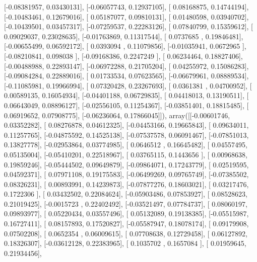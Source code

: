 \documentclass{article}
\begin{document}
       [-0.08381957,  0.03430131],
       [-0.06057743,  0.12937105],
       [ 0.08168875,  0.14744194],
       [-0.10483461,  0.12679016],
       [ 0.05187077,  0.09810131],
       [ 0.01480598,  0.03940702],
       [-0.10439501,  0.03457317],
       [-0.07259537,  0.22283126],
       [ 0.07840799,  0.15359612],
       [ 0.09029037,  0.23028635],
       [-0.01763869,  0.11317544],
       [ 0.0737685 ,  0.19846481],
       [-0.00655499,  0.06592172],
       [ 0.0393094 ,  0.11079856],
       [-0.01035941,  0.0672965 ],
       [-0.08210841,  0.098038  ],
       [-0.09168386,  0.2247249 ],
       [ 0.06234464,  0.18827406],
       [-0.00488988,  0.22893147],
       [-0.06972288,  0.21705204],
       [ 0.04255972,  0.15086283],
       [-0.09084284,  0.22889016],
       [ 0.01733534,  0.07623565],
       [-0.06679961,  0.08889534],
       [-0.11085981,  0.19966994],
       [ 0.07320428,  0.23267693],
       [ 0.0361381 ,  0.04700952],
       [ 0.00589135,  0.16054934],
       [-0.04401188,  0.06729835],
       [ 0.04418013,  0.13190511],
       [ 0.06643049,  0.08896127],
       [-0.02556105,  0.11254367],
       [-0.03851401,  0.18815485],
       [ 0.06919652,  0.07908775],
       [-0.06236064,  0.17866045]]), array([[-0.00601746,  0.03352282],
       [ 0.08276878,  0.04612325],
       [-0.04453166,  0.19665843],
       [ 0.09634011,  0.11257765],
       [-0.04875592,  0.14525138],
       [-0.07537578,  0.06091467],
       [-0.07851013,  0.13827778],
       [-0.02953864,  0.03774985],
       [ 0.0646512 ,  0.16645482],
       [ 0.04557495,  0.05135004],
       [-0.05410201,  0.22518967],
       [ 0.03765115,  0.1443656 ],
       [ 0.00968638,  0.19859246],
       [-0.05444502,  0.09649879],
       [-0.09864071,  0.17243779],
       [ 0.02519595,  0.04592371],
       [ 0.07971108,  0.19175583],
       [-0.06499269,  0.09765749],
       [-0.07385502,  0.08326231],
       [ 0.00893991,  0.14239873],
       [-0.07877276,  0.18603021],
       [ 0.03217476,  0.1722306 ],
       [ 0.03432502,  0.22084624],
       [-0.05903486,  0.07853927],
       [ 0.08528623,  0.21019425],
       [-0.0015723 ,  0.22402492],
       [-0.03521497,  0.07784737],
       [ 0.08060197,  0.09893977],
       [ 0.05220434,  0.03557496],
       [ 0.05132089,  0.19138385],
       [-0.05515987,  0.16727411],
       [ 0.08157893,  0.17520827],
       [-0.05587947,  0.18078174],
       [ 0.09179908,  0.07502208],
       [ 0.0652354 ,  0.06009615],
       [ 0.07708638,  0.12729458],
       [ 0.06127892,  0.18326307],
       [-0.03612128,  0.22383965],
       [ 0.1035702 ,  0.1657084 ],
       [ 0.01959645,  0.21934456],
\end{document}

